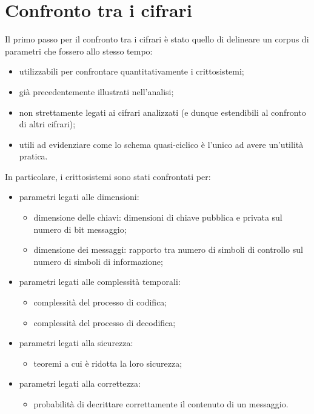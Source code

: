 \documentclass[12pt, a4paper]{report}
\theoremstyle{definition}
\begin{document}
		\section{Confronto tra i cifrari}
			Il primo passo per il confronto tra i cifrari è stato quello di delineare un corpus di parametri che fossero allo stesso tempo:
			\begin{itemize}
				\item utilizzabili per confrontare quantitativamente i crittosistemi;
				\item già precedentemente illustrati nell'analisi;
				\item non strettamente legati ai cifrari analizzati (e dunque estendibili al confronto di altri cifrari);
				\item utili ad evidenziare come lo schema quasi-ciclico è l'unico ad avere un'utilità pratica.
			\end{itemize}
			In particolare, i crittosistemi sono stati confrontati per:
				\begin{itemize}
					\item parametri legati alle dimensioni:
					\begin{itemize}
						\item dimensione delle chiavi: dimensioni di chiave pubblica e privata sul numero di bit messaggio;
						\item dimensione dei messaggi: rapporto tra numero di simboli di controllo sul numero di simboli di informazione;
					\end{itemize}
					\item parametri legati alle complessità temporali:
					\begin{itemize}
						\item complessità del processo di codifica;
						\item complessità del processo di decodifica;
					\end{itemize}
					\item parametri legati alla sicurezza:
					\begin{itemize}
						\item teoremi a cui è ridotta la loro sicurezza;
					\end{itemize}
					\item parametri legati alla correttezza:
					\begin{itemize}
						\item probabilità di decrittare correttamente il contenuto di un messaggio.
					\end{itemize}
				\end{itemize}
\end{document}
